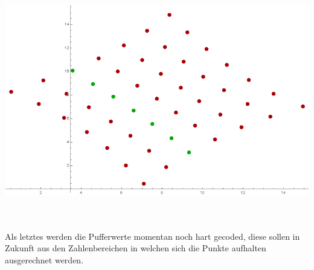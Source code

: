 \begin{minipage}{\linewidth}
	\centering
	\includegraphics[width=1\linewidth]{images/AlgExtrBsp.png}
\end{minipage}\\\\


Als letztes werden die Pufferwerte momentan noch hart gecoded, diese sollen in Zukunft aus den Zahlenbereichen in welchen sich die Punkte aufhalten ausgerechnet werden.
